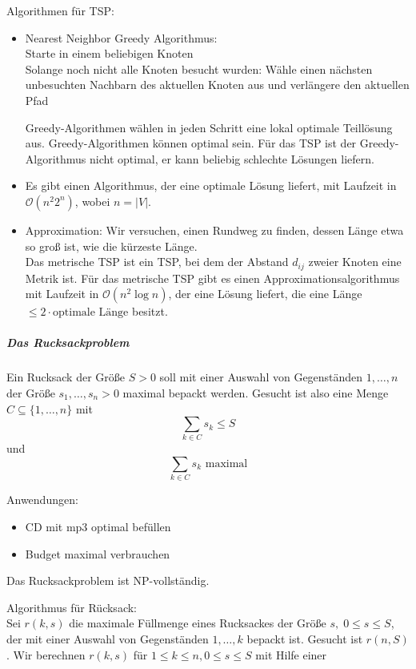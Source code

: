 \documentclass[a4paper]{scrartcl}
\begin{document}
Algorithmen für TSP:
\begin{itemize}
\item Nearest Neighbor Greedy Algorithmus:\\
Starte in einem beliebigen Knoten\\
Solange noch nicht alle Knoten besucht wurden:
Wähle einen nächsten unbesuchten Nachbarn des aktuellen Knoten aus und verlängere den aktuellen Pfad

Greedy-Algorithmen wählen in jeden Schritt eine lokal optimale Teillösung aus. Greedy-Algorithmen können optimal sein. Für das TSP ist der Greedy-Algorithmus nicht optimal, er kann beliebig schlechte Lösungen liefern.

\item Es gibt einen Algorithmus, der eine optimale Lösung liefert, mit Laufzeit in $\mathcal{O} (n^2 2^n)$, wobei $n= \lvert V \rvert$.

\item Approximation: Wir versuchen, einen Rundweg zu finden, dessen Länge etwa so groß ist, wie die kürzeste Länge.\\
Das metrische TSP ist ein TSP, bei dem der Abstand $d_{ij}$ zweier Knoten eine Metrik ist. Für das metrische TSP gibt es einen Approximationsalgorithmus mit Laufzeit in $\mathcal{O} (n^2 \log{n})$, der eine Lösung liefert, die eine Länge $\leq 2\cdot \text{optimale Länge}$ besitzt.
\end{itemize}

\subparagraph{Das Rucksackproblem} Ein Rucksack der Größe $S>0$ soll mit einer Auswahl von Gegenständen $1,\dots,n$ der Größe $s_1,\dots,s_n > 0$ maximal bepackt werden. Gesucht ist also eine Menge $C \subseteq \{1,\dots,n\}$ mit 
\[ \sum\limits_{k \in C} s_k \leq S\] und
\[ \sum\limits_{k \in C} s_k \text{ maximal}\]

Anwendungen:
\begin{itemize}
\item CD mit mp3 optimal befüllen
\item Budget maximal verbrauchen
\end{itemize}
Das Rucksackproblem ist \textsc{NP}-vollständig.

Algorithmus für Rücksack:\\
Sei $r(k,s)$ die maximale Füllmenge eines Rucksackes der Größe $s, \; 0 \leq s \leq S$, der mit einer Auswahl von Gegenständen $1,\dots,k$ bepackt ist. Gesucht ist $r(n,S)$. Wir berechnen $r(k,s)$ für $1 \leq k \leq n, 0 \leq s \leq S$ mit Hilfe einer %
\end{document}
